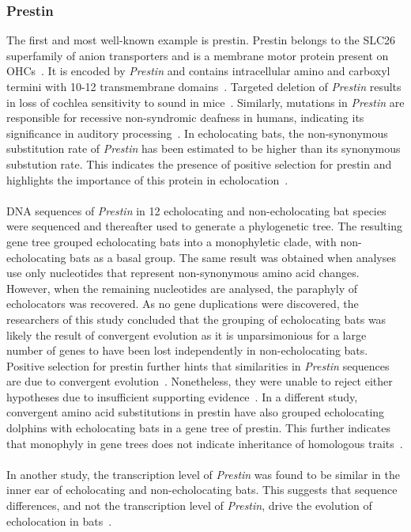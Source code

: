 \documentclass[11pt]{article}
\begin{document}
\subsubsection{Prestin}
The first and most well-known example is prestin. Prestin belongs to the SLC26 superfamily of anion transporters and is a membrane motor protein present on OHCs~\citep{Zheng2000}. It is encoded by \textit{Prestin} and contains intracellular amino and carboxyl termini with 10-12 transmembrane domains~\citep{Li2008a}. Targeted deletion of \textit{Prestin} results in loss of cochlea sensitivity to sound in mice~\citep{Liberman2002}. Similarly, mutations in \textit{Prestin} are responsible for recessive non-syndromic deafness in humans, indicating its significance in auditory processing~\citep{Liu2003}. In echolocating bats, the non-synonymous substitution rate of \textit{Prestin} has been estimated to be higher than its synonymous substution rate. This indicates the presence of positive selection for prestin and highlights the importance of this protein in echolocation~\citep{Li2008a}. 
\\
\\
DNA sequences of \textit{Prestin} in 12 echolocating and non-echolocating bat species were sequenced and thereafter used to generate a phylogenetic tree. The resulting gene tree grouped echolocating bats into a monophyletic clade, with non-echolocating bats as a basal group. The same result was obtained when analyses use only nucleotides that represent non-synonymous amino acid changes. However, when the remaining nucleotides are analysed, the paraphyly of echolocators was recovered. As no gene duplications were discovered, the researchers of this study concluded that the grouping of echolocating bats was likely the result of convergent evolution as it is unparsimonious for a large number of genes to have been lost independently in non-echolocating bats. Positive selection for prestin further hints that similarities in \textit{Prestin} sequences are due to convergent evolution~\citep{Li2008a}. Nonetheless, they were unable to reject either hypotheses due to insufficient supporting evidence~\citep{Li2008a}. In a different study, convergent amino acid substitutions in prestin have also grouped echolocating dolphins with echolocating bats in a gene tree of prestin. This further indicates that monophyly in gene trees does not indicate inheritance of homologous traits~\citep{Liu2010}. 
\\
\\
In another study, the transcription level of \textit{Prestin} was found to be similar in the inner ear of echolocating and non-echolocating bats. This suggests that sequence differences, and not the transcription level of \textit{Prestin}, drive the evolution of echolocation in bats~\citep{Eick2005}.
\\
\end{document}
